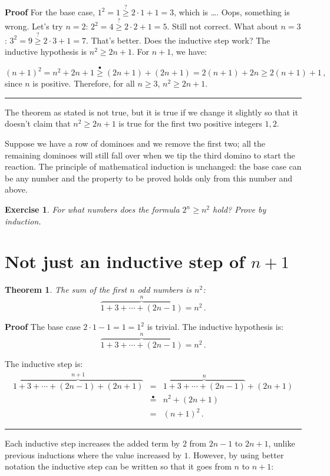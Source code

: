 \documentclass[11pt,a4paper]{report}
\newcommand*{\ih}{\stackrel{\bullet}{=}}
\newcommand*{\ihge}{\stackrel{\bullet}{\geq}}
\newcommand*{\qge}{\stackrel{?}{\geq}}
\newcommand*{\qed}{\hfill\rule{1ex}{1.5ex}}
\newcommand*{\qedd}[1]{\vspace*{-#1ex}\qed}
\newtheorem{theorem}{Theorem}
\newtheorem{exercise}{Exercise}
\begin{document}
\textbf{Proof} For the base case, $1^2 = 1 \qge 2\cdot 1+1 = 3$, which is \ldots. Oops, something is wrong. Let's try $n=2$: $2^2 = 4 \qge 2\cdot 2+1 = 5$. Still not correct. What about $n=3$: $3^2 = 9 \qge 2\cdot 3+1 = 7$. That's better. Does the inductive step work? The inductive hypothesis is $n^2 \geq 2n+1$. For $n+1$, we have:

\[
(n+1)^2 = n^2 + 2n + 1 \ihge{}
(2n+1)+(2n+1) = 2(n+1) + 2n \geq 2(n+1)+1\,,
\]
since $n$ is positive. Therefore, for all $n\geq 3$, $n^2\geq 2n+1$.\qed

The theorem as stated is not true, but it is true if we change it slightly so that it doesn't claim that $n^2\geq 2n+1$ is true for the first two positive integers $1,2$.

Suppose we have a row of dominoes and we remove the first two; all the remaining dominoes will still fall over when we tip the third domino to start the reaction. The principle of mathematical induction is unchanged: the base case can be any number and the property to be proved holds only from this number and above.

\begin{exercise}
For what numbers does the formula $2^n\geq n^2$ hold? Prove by induction.
\end{exercise}

\section{Not just an inductive step of $n+1$}

\begin{theorem}
The sum of the first $n$ odd numbers is $n^2$:
\[
\overbrace{1 + 3 + \cdots + (2n-1)}^{n} = n^2\,.
\]
\end{theorem}

\textbf{Proof} The base case $2\cdot 1-1=1=1^2$ is trivial. The inductive hypothesis is:
\[
\overbrace{1 + 3 + \cdots + (2n-1)}^{n} = n^2\,.
\]

\newpage

The inductive step is:
\begin{eqnarray*}
\overbrace{1 + 3 + \cdots + (2n-1) + (2n+1)}^{n+1} &=& \overbrace{1 + 3 + \cdots + (2n-1)}^{n} + (2n+1)\\
&\ih{}& n^2 + (2n+1)\\
&=&(n+1)^2\,.
\end{eqnarray*}

\qedd{5}

Each inductive step increases the added term by $2$ from $2n-1$ to $2n+1$, unlike previous inductions where the value increased by $1$. However, by using better notation the inductive step can be written so that it goes from $n$ to $n+1$:
\end{document}

